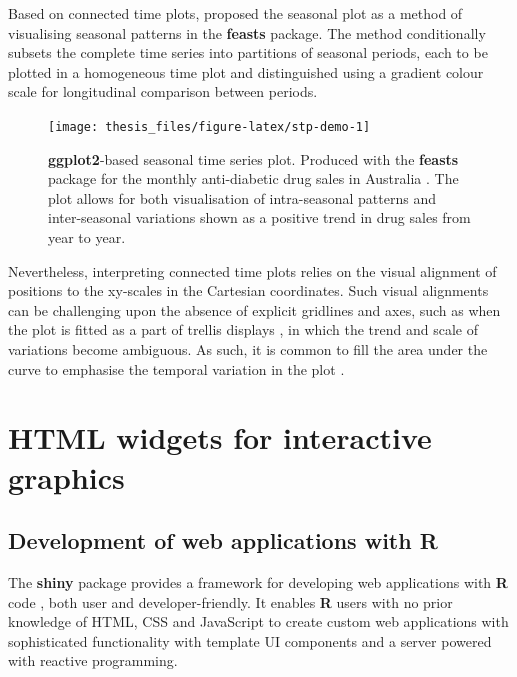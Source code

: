 \documentclass{aucklandthesis}
\begin{document}
Based on connected time plots, \textcite{feasts} proposed the seasonal plot as a method of visualising seasonal patterns in the \textbf{feasts} package. The method conditionally subsets the complete time series into partitions of seasonal periods, each to be plotted in a homogeneous time plot and distinguished using a gradient colour scale for longitudinal comparison between periods.

\begin{figure}
\texttt{[image: thesis\_files/figure-latex/stp-demo-1]} \caption{\textbf{ggplot2}-based seasonal time series plot. Produced with the \textbf{feasts} package for the monthly anti-diabetic drug sales in Australia \autocite{fpp3d}. The plot allows for both visualisation of intra-seasonal patterns and inter-seasonal variations shown as a positive trend in drug sales from year to year.}\label{fig:stp-demo}
\end{figure}



Nevertheless, interpreting connected time plots relies on the visual alignment of positions to the xy-scales in the Cartesian coordinates. Such visual alignments can be challenging upon the absence of explicit gridlines and axes, such as when the plot is fitted as a part of trellis displays \autocite{trellis}, in which the trend and scale of variations become ambiguous. As such, it is common to fill the area under the curve to emphasise the temporal variation in the plot \autocite{dataviz-ts}.

\hypertarget{html-widgets-for-interactive-graphics}{%
\section{HTML widgets for interactive graphics}\label{html-widgets-for-interactive-graphics}}

\hypertarget{sec:shiny}{%
\subsection{Development of web applications with R}\label{sec:shiny}}

The \textbf{shiny} package \autocite{shiny} provides a framework for developing web applications with \textbf{R} code \autocite{R2021}, both user and developer-friendly. It enables \textbf{R} users with no prior knowledge of HTML, CSS and JavaScript to create custom web applications with sophisticated functionality with template UI components and a server powered with reactive programming.
\end{document}
